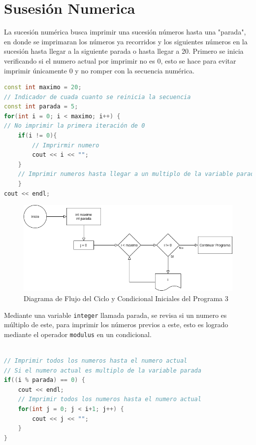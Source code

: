 \documentclass[12pt]{article}
\begin{document}
\section{Susesión Numerica}

La sucesión numérica busca imprimir una sucesión números hasta una "parada", en donde se imprimaran los números ya recorridos y los siguientes números en la sucesión hasta llegar a la siguiente parada o hasta llegar a 20. Primero se inicia verificando si el numero actual por imprimir no es 0, esto se hace para evitar imprimir únicamente 0 y no romper con la secuencia numérica.

\begin{lstlisting}[language=c++]
const int maximo = 20;
// Indicador de cuada cuanto se reinicia la secuencia
const int parada = 5;
for(int i = 0; i < maximo; i++) {
// No imprimir la primera iteración de 0
    if(i != 0){
        // Imprirmir numero
        cout << i << "";
    }
    // Imprimir numeros hasta llegar a un multiplo de la variable parada
    }
cout << endl;
\end{lstlisting}

\begin{figure}[H]
    \caption{Diagrama de Flujo del Ciclo y Condicional Iniciales del Programa 3}
    \centering
    \includegraphics[scale=0.5]{programa3_ciclo1.png}
\end{figure}

Mediante una variable \verb+integer+ llamada parada, se revisa si un numero es múltiplo de este, para imprimir los números previos a este, esto es logrado mediante el operador \verb+modulus+ en un condicional.

\begin{lstlisting}[language=c++]

// Imprimir todos los numeros hasta el numero actual
// Si el numero actual es multiplo de la variable parada
if((i % parada) == 0) {
    cout << endl;
    // Imprimir todos los numeros hasta el numero actual
    for(int j = 0; j < i+1; j++) {
        cout << j << "";
    }
} 
\end{lstlisting}
\end{document}
